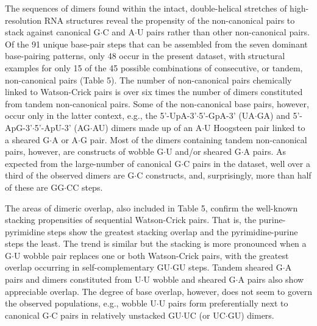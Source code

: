 The  sequences  of  dimers  found within  the  intact,  double-helical
stretches of  high-resolution RNA structures reveal  the propensity of
the  non-canonical  pairs to  stack  against  canonical G$\cdot$C  and
A$\cdot$U  pairs rather  than  other non-canonical  pairs.  Of the  91
unique base-pair steps  that can be assembled from  the seven dominant
base-pairing  patterns, only  48 occur  in the  present  dataset, with
structural examples  for only  15 of the  45 possible  combinations of
consecutive, or tandem, non-canonical pairs (Table 5). The number of
non-canonical pairs  chemically linked  to Watson-Crick pairs  is over
six times  the number of dimers constituted  from tandem non-canonical
pairs. Some of the non-canonical  base pairs, however, occur only in
the   latter  context,   e.g.,  the   5'-UpA-3'$\cdot$5'-GpA-3'
(UA$\cdot$GA)  and 5'-ApG-3'$\cdot$5'-ApU-3'  (AG$\cdot$AU) dimers
made up of  an A$\cdot$U Hoogsteen pair linked  to a sheared G$\cdot$A
or A$\cdot$G pair. Most  of the dimers containing tandem non-canonical
pairs,  however, are  constructs  of wobble  G$\cdot$U and/or  sheared
G$\cdot$A  pairs.  As  expected  from the  large-number  of  canonical
G$\cdot$C  pairs in the  dataset, well  over a  third of  the observed
dimers are  G$\cdot$C constructs, and, surprisingly,  more than half
of these are GG$\cdot$CC steps.

The areas  of dimeric overlap, also  included in Table  5, confirm the
well-known   stacking    propensities   of   sequential   Watson-Crick
pairs. That is, the purine-pyrimidine steps show the greatest stacking
overlap  and  the pyrimidine-purine  steps  the  least.  The trend  is
similar but  the stacking is  more pronounced when a  G$\cdot$U wobble
pair  replaces  one or  both  Watson-Crick  pairs,  with the  greatest
overlap  occurring  in  self-complementary GU$\cdot$GU  steps.  Tandem
sheared G$\cdot$A pairs and dimers constituted from U$\cdot$U wobble
and sheared G$\cdot$A pairs also show appreciable overlap.  The degree
of  base  overlap, however,  does  not  seem  to govern  the  observed
populations, e.g., wobble U$\cdot$U pairs form preferentially next to
canonical  G$\cdot$C  pairs in  relatively  unstacked GU$\cdot$UC  (or
UC$\cdot$GU) dimers.

